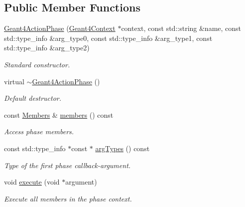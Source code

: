 \subsection*{Public Member Functions}
\begin{DoxyCompactItemize}
\item 
\hyperlink{class_d_d4hep_1_1_simulation_1_1_geant4_action_phase_a8ede43df709ab0035560db446aa2f8ad}{Geant4ActionPhase} (\hyperlink{class_d_d4hep_1_1_simulation_1_1_geant4_context}{Geant4Context} $\ast$context, const std::string \&name, const std::type\_\-info \&arg\_\-type0, const std::type\_\-info \&arg\_\-type1, const std::type\_\-info \&arg\_\-type2)
\begin{DoxyCompactList}\small\item\em Standard constructor. \item\end{DoxyCompactList}\item 
virtual \hyperlink{class_d_d4hep_1_1_simulation_1_1_geant4_action_phase_ae2d320d1dd7f433b5defb6f4fed5d757}{$\sim$Geant4ActionPhase} ()
\begin{DoxyCompactList}\small\item\em Default destructor. \item\end{DoxyCompactList}\item 
const \hyperlink{class_d_d4hep_1_1_simulation_1_1_geant4_action_phase_a4df9a501a5c2d810603cd58f5ff5157d}{Members} \& \hyperlink{class_d_d4hep_1_1_simulation_1_1_geant4_action_phase_a350be3254b4fd82068c18fec6381491e}{members} () const 
\begin{DoxyCompactList}\small\item\em Access phase members. \item\end{DoxyCompactList}\item 
const std::type\_\-info $\ast$const $\ast$ \hyperlink{class_d_d4hep_1_1_simulation_1_1_geant4_action_phase_ac481d5b2c86b3fd20ffc4adaf593a17a}{argTypes} () const 
\begin{DoxyCompactList}\small\item\em Type of the first phase callback-\/argument. \item\end{DoxyCompactList}\item 
void \hyperlink{class_d_d4hep_1_1_simulation_1_1_geant4_action_phase_a69f90116c5b2b689cf25e88e0a9f90e7}{execute} (void $\ast$argument)
\begin{DoxyCompactList}\small\item\em Execute all members in the phase context. \item\end{DoxyCompactList}\item 

\end{DoxyCompactItemize}
